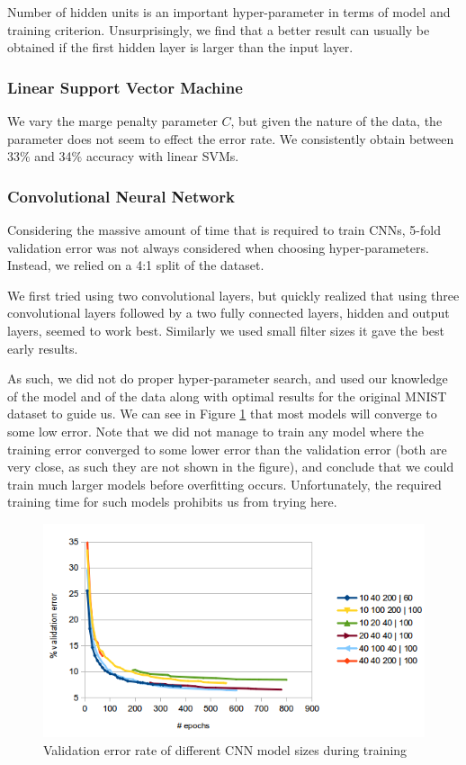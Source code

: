 \documentclass{acm_proc_article-sp}
\begin{document}
Number of hidden units is an important hyper-parameter in terms of model and training criterion. Unsurprisingly, we find that a better result can usually be obtained if the first hidden layer is larger than the input layer.

\subsubsection{Linear Support Vector Machine }
We vary the marge penalty parameter $C$, but given the nature of the data, the parameter does not seem to effect the error rate. We consistently obtain between 33$\%$ and 34$\%$ accuracy with linear SVMs.

\subsubsection{Convolutional Neural Network}
Considering the massive amount of time that is required to train CNNs, 5-fold validation error was not always considered when choosing hyper-parameters. Instead, we relied on a 4:1 split of the dataset. 

We first tried using two convolutional layers, but quickly realized that using three convolutional layers followed by a two fully connected layers, hidden and output layers, seemed to work best. Similarly we used small filter sizes it gave the best early results. 

As such, we did not do proper hyper-parameter search, and used our knowledge of the model and of the data along with optimal results for the original MNIST dataset to guide us. We can see in Figure \ref{fig:conv_train} that most models will converge to some low error. Note that we did not manage to train any model where the training error converged to some lower error than the validation error (both are very close, as such they are not shown in the figure), and conclude that we could train much larger models before overfitting occurs. Unfortunately, the required training time for such models prohibits us from trying here.
\begin{figure} 
\centering
\includegraphics[width=1\columnwidth]{graphs/conv_train.png}  
\caption{Validation error rate of different CNN model sizes during training}
\label{fig:conv_train}
\end{figure}
\end{document}
